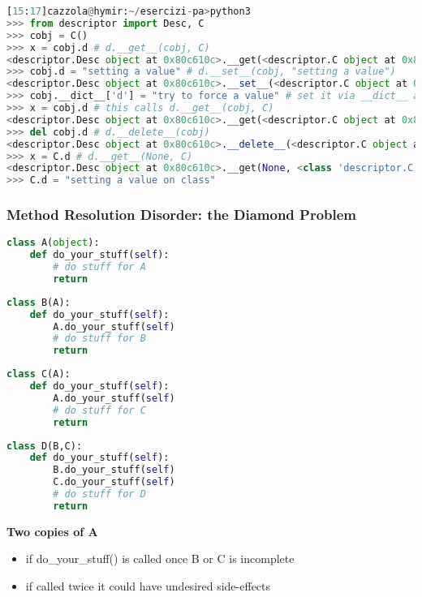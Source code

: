 \begin{lstlisting}[language=Python]
[15:17]cazzola@hymir:~/esercizi-pa>python3
>>> from descriptor import Desc, C
>>> cobj = C()
>>> x = cobj.d # d.__get__(cobj, C)
<descriptor.Desc object at 0x80c610c>.__get(<descriptor.C object at 0x80c3b0c>, <class 'descriptor.C'>)
>>> cobj.d = "setting a value" # d.__set__(cobj, "setting a value")
<descriptor.Desc object at 0x80c610c>.__set__(<descriptor.C object at 0x80c3b0c>, setting a value)
>>> cobj.__dict__['d'] = "try to force a value" # set it via __dict__ avoiding the descriptor
>>> x = cobj.d # this calls d.__get__(cobj, C)
<descriptor.Desc object at 0x80c610c>.__get(<descriptor.C object at 0x80c3b0c>, <class 'descriptor.C'>)
>>> del cobj.d # d.__delete__(cobj)
<descriptor.Desc object at 0x80c610c>.__delete__(<descriptor.C object at 0x80c3b0c>)
>>> x = C.d # d.__get__(None, C)
<descriptor.Desc object at 0x80c610c>.__get(None, <class 'descriptor.C'>)
>>> C.d = "setting a value on class" 
\end{lstlisting}

\subsubsection{Method Resolution Disorder: the Diamond Problem}

\begin{lstlisting}[language=Python]
class A(object):
	def do_your_stuff(self):
		# do stuff for A
		return
\end{lstlisting}

\begin{lstlisting}[language=Python]
class B(A):
	def do_your_stuff(self):
		A.do_your_stuff(self)
		# do stuff for B
		return
\end{lstlisting}

\begin{lstlisting}[language=Python]
class C(A):
	def do_your_stuff(self):
		A.do_your_stuff(self)
		# do stuff for C
		return
\end{lstlisting}

\begin{lstlisting}[language=Python]
class D(B,C):
	def do_your_stuff(self):
		B.do_your_stuff(self)
		C.do_your_stuff(self)
		# do stuff for D
		return
\end{lstlisting}

\textbf{Two copies of A}
\begin{itemize}
	\item if do\_your\_stuff() is called once B or C is incomplete
	\item if called twice it could have undesired side-effects
\end{itemize}

